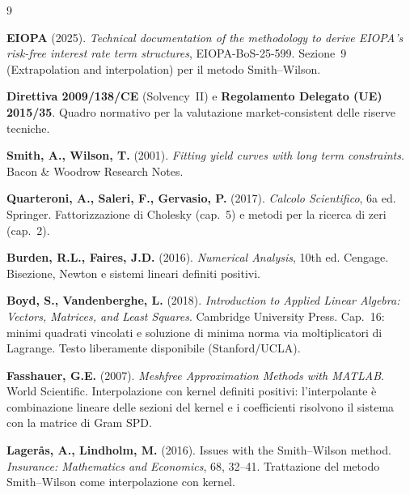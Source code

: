 \documentclass[11pt,a4paper]{article}
\theoremstyle{plain}
\theoremstyle{definition}
\theoremstyle{remark}
\begin{document}
\renewcommand{\refname}{Riferimenti bibliografici}
\begin{thebibliography}{9}

  \textbf{EIOPA} (2025).
  \textit{Technical documentation of the methodology to derive EIOPA's risk-free interest rate
  term structures}, EIOPA-BoS-25-599.
  Sezione~9 (Extrapolation and interpolation) per il metodo Smith--Wilson.

  \textbf{Direttiva 2009/138/CE} (Solvency~II) e
  \textbf{Regolamento Delegato (UE) 2015/35}.
  Quadro normativo per la valutazione market-consistent delle riserve tecniche.

  \textbf{Smith, A., Wilson, T.} (2001).
  \textit{Fitting yield curves with long term constraints}.
  Bacon \& Woodrow Research Notes.

  \textbf{Quarteroni, A., Saleri, F., Gervasio, P.} (2017).
  \textit{Calcolo Scientifico}, 6a ed. Springer.
  Fattorizzazione di Cholesky (cap.~5) e metodi per la ricerca di zeri (cap.~2).

  \textbf{Burden, R.L., Faires, J.D.} (2016).
  \textit{Numerical Analysis}, 10th ed. Cengage.
  Bisezione, Newton e sistemi lineari definiti positivi.

  \textbf{Boyd, S., Vandenberghe, L.} (2018).
  \textit{Introduction to Applied Linear Algebra: Vectors, Matrices, and Least Squares}.
  Cambridge University Press.
  Cap.~16: minimi quadrati vincolati e soluzione di minima norma via moltiplicatori di
  Lagrange. Testo liberamente disponibile (Stanford/UCLA).

  \textbf{Fasshauer, G.E.} (2007).
  \textit{Meshfree Approximation Methods with MATLAB}. World Scientific.
  Interpolazione con kernel definiti positivi: l'interpolante \`e combinazione lineare delle
  sezioni del kernel e i coefficienti risolvono il sistema con la matrice di Gram SPD.

  \textbf{Lager\aa s, A., Lindholm, M.} (2016).
  Issues with the Smith--Wilson method.
  \textit{Insurance: Mathematics and Economics}, 68, 32--41.
  Trattazione del metodo Smith--Wilson come interpolazione con kernel.

\end{thebibliography}
\end{document}
